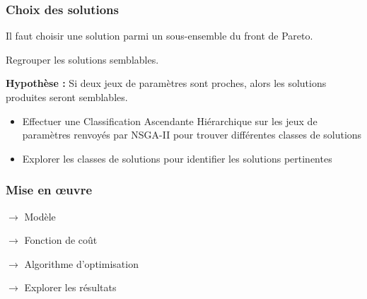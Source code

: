\documentclass[xcolor={dvipsnames}]{beamer}
\begin{document}
\begin{frame}
 \frametitle{Choix des solutions}
 
 Il faut choisir une solution parmi un sous-ensemble du front de Pareto.
 
 \vspace{1cm}
 
 Regrouper les solutions semblables.
 
 \vspace{0.2cm}
 
 \textbf{Hypothèse : } Si deux jeux de paramètres sont proches, alors les solutions produites seront semblables.
 
 \vspace{0.2cm}
 
 \begin{itemize}
  \item  Effectuer une Classification Ascendante Hiérarchique sur les jeux de paramètres renvoyés par NSGA-II pour trouver différentes classes de solutions
  \item Explorer les classes de solutions pour identifier les solutions pertinentes
 \end{itemize}

%  
%  
%  
%  
%  
%  
%  
\end{frame}












\begin{frame}
 \frametitle{Mise en œuvre}
 
 $\longrightarrow$ Modèle
 
 \vspace{0.6cm}
 
 $\longrightarrow$ Fonction de coût
 
 \vspace{0.6cm}
 
 $\longrightarrow$ Algorithme d'optimisation
 
 \vspace{0.6cm}
 
 $\longrightarrow$ Explorer les résultats
\end{frame}
\end{document}
